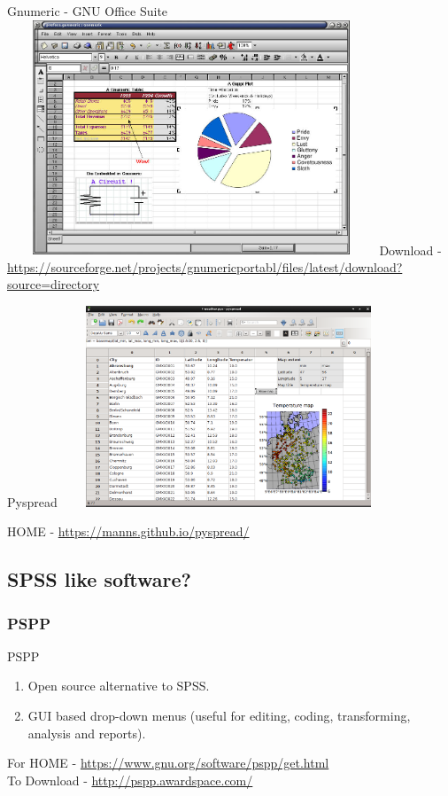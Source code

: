 \documentclass{beamer}
\begin{document}
\begin{frame}{Gnumeric - GNU Office Suite}
\centering 
\includegraphics[height=7cm, width=11cm]{gnumeric}
Download - \url{https://sourceforge.net/projects/gnumericportabl/files/latest/download?source=directory}
\end{frame}

\begin{frame}{Pyspread}
\centering 
\includegraphics[height=6cm, width=10cm]{pyspread}

HOME - \url{https://manns.github.io/pyspread/}
\end{frame}

\subsection{SPSS like software?}

\subsubsection{PSPP}

\begin{frame}{PSPP}
	\begin{enumerate}
		\item Open source alternative to SPSS. 
		\item GUI based drop-down menus (useful for editing, coding, transforming, analysis and reports). 

	\end{enumerate}
	
For HOME - \url{https://www.gnu.org/software/pspp/get.html} \\ \vspace{1cm}
To Download - \url{http://pspp.awardspace.com/}	
\end{frame}
\end{document}
